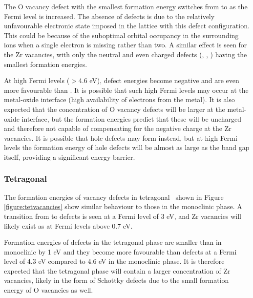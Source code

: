 The O vacancy defect with the smallest formation energy switches from  to  as the Fermi level is increased. The absence of  defects is due to the relatively unfavourable electronic state imposed in the lattice with this defect configuration. This could be because of the suboptimal orbital occupancy in the surrounding ions when a single electron is missing rather than two. A similar effect is seen for the Zr vacancies, with only the neutral and even charged defects (, , ) having the smallest formation energies.

At high Fermi levels ($>$4.6 eV),  defect energies become negative and are even more favourable than . It is possible that such high Fermi levels may occur at the metal-oxide interface (high availability of electrons from the metal). It is also expected that the concentration of O vacancy defects will be larger at the metal-oxide interface, but the formation energies predict that these will be uncharged and therefore not capable of compensating for the negative charge at the Zr vacancies. It is possible that hole defects may form instead, but at high Fermi levels the formation energy of hole defects will be almost as large as the band gap itself, providing a significant energy barrier.

\subsubsection{Tetragonal}

The formation energies of vacancy defects in tetragonal \zirconia\ shown in Figure \ref{figure:tetvacancies} show similar behaviour to those in the monoclinic phase. A transition from  to  defects is seen at a Fermi level of 3 eV, and Zr vacancies will likely exist as  at Fermi levels above 0.7 eV. 

Formation energies of  defects in the tetragonal phase are smaller than in monoclinic by 1 eV and they become more favourable than  defects at a Fermi level of 4.3 eV compared to 4.6 eV in the monoclinic phase. It is therefore expected that the tetragonal phase will contain a larger concentration of Zr vacancies, likely in the form of Schottky defects due to the small formation energy of O vacancies as well.


